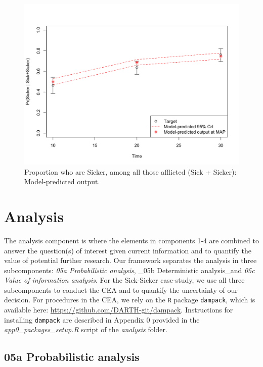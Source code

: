 \documentclass[]{book}
\begin{document}
\begin{figure}

{\centering \includegraphics[width=1\linewidth]{../figs/04_posterior_vs_targets_proportion_sicker} 

}

\caption{Proportion who are Sicker, among all those afflicted (Sick + Sicker): Model-predicted output.}\label{fig:04-proportion}
\end{figure}

\hypertarget{analysis}{%
\chapter{Analysis}\label{analysis}}

The analysis component is where the elements in components 1-4 are combined to answer the question(s) of interest given current information and to quantify the value of potential further research. Our framework separates the analysis in three subcomponents: \emph{05a Probabilistic analysis}, \_05b Deterministic analysis\_and \emph{05c Value of information analysis}. For the Sick-Sicker case-study, we use all three subcomponents to conduct the CEA and to quantify the uncertainty of our decision. For procedures in the CEA, we rely on the \texttt{R} package \texttt{dampack}, which is available here: \url{https://github.com/DARTH-git/dampack}. Instructions for installing \texttt{dampack} are described in Appendix 0 provided in the \emph{app0\_packages\_setup.R} script of the \emph{analysis} folder.

\hypertarget{Probabilistic-analysis}{%
\section{05a Probabilistic analysis}\label{Probabilistic-analysis}}
\end{document}
